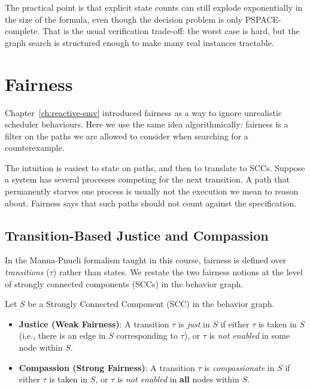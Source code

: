 \medskip\noindent
The practical point is that explicit state counts can still explode
exponentially in the size of the formula, even though the decision problem is
only PSPACE-complete.  That is the usual verification trade-off: the worst
case is hard, but the graph search is structured enough to make many real
instances tractable.

\section{Fairness}
\label{sec:ltl-mc-fairness}

Chapter~\ref{ch:reactive-smv} introduced fairness as a way to ignore
unrealistic scheduler behaviours.  Here we use the same idea algorithmically:
fairness is a filter on the paths we are allowed to consider when searching
for a counterexample.

The intuition is easiest to state on paths, and then to translate to SCCs.
Suppose a system has several processes competing for the next transition.  A
path that permanently starves one process is usually not the execution we
mean to reason about.  Fairness says that such paths should not count against
the specification.

\subsection{Transition-Based Justice and Compassion}

In the Manna-Pnueli formalism taught in this course, fairness is defined over \emph{transitions} ($\tau$) rather than states. We restate the two fairness notions at the level of strongly connected components (SCCs) in the behavior graph.

\begin{definition}
Let $S$ be a Strongly Connected Component (SCC) in the behavior graph.
\begin{itemize}
  \item \textbf{Justice (Weak Fairness)}: A transition $\tau$ is \emph{just} in $S$ if either $\tau$ is taken in $S$ (i.e., there is an edge in $S$ corresponding to $\tau$), or $\tau$ is \emph{not enabled} in some node within $S$.
  \item \textbf{Compassion (Strong Fairness)}: A transition $\tau$ is \emph{compassionate} in $S$ if either $\tau$ is taken in $S$, or $\tau$ is \emph{not enabled} in \textbf{all} nodes within $S$.
\end{itemize}
\end{definition}

